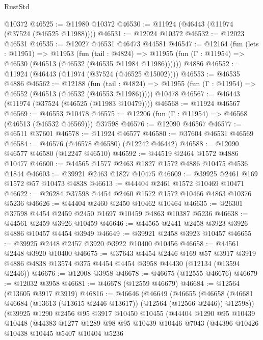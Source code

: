 \begin{lexlean}{RustStd}
\begin{coremodule}
    @10372
@46525 := @11980 @10372
@46530 := @11924 (@46443 (@11974 (@37524 (@46525 @11988))))
@46531 := @12024 @10372
@46532 := @12023 @46531
@46535 := @12027 @46531 @46473 @44581
@46547 := @12164
    (fun (lets : @11951) =>
    @11953
      (fun (tail : @4824) =>
      @11955 (fun (Γ : @11954) => @46530 (@46513 (@46532 (@46535 @11984 @11986))))))
    @4886
@46552 := @11924 (@46443 (@11974 (@37524 (@46525 @15002))))
@46553 := @46535 @4886
@46562 := @12188
    (fun (tail : @4824) => @11955 (fun (Γ : @11954) => @46552 (@46513 (@46532 (@46553 @11986)))))
    @10478
@46567 := @46443 (@11974 (@37524 (@46525 (@11983 @10479))))
@46568 := @11924 @46567
@46569 := @46553 @10478
@46575 := @12206 (fun (Γ : @11954) => @46568 (@46513 (@46532 @46569))) @37598
@46576 := @12090 @46567
@46577 := @46511 @37601
@46578 := @11924 @46577
@46580 := @37604 @46531 @46569
@46584 := @46576 (@46578 @46580) (@12242 @46442)
@46588 := @12090 @46577 @46580 (@12247 @46510)
@46592 := @44519 @2464 @1572 @4886 @10477
@46600 := @44565 @1577 @2463 @1827 @1572 @4886 @10475 @4536 @1844
@46603 := @39921 @2463 @1827 @10475
@46609 := @39925 @2461 @169 @1572 @57 @10473 @4838
@46613 := @44404 @2461 @1572 @10469 @10471
@46622 := @26284 @37598 @4454 @2460 @1572 @1572 @10466 @4863 @10376 @5236
@46626 := @44404 @2460 @2450 @10462 @10464
@46635 := @26301 @37598 @4454 @2459 @2450 @1697 @10459 @4863 @10387 @5236
@46638 := @44561 @2459 @3926 @10459
@46646 := @44565 @2441 @2458 @3923 @3926 @4886 @10457 @4454 @3949
@46649 := @39921 @2458 @3923 @10457
@46655 := @39925 @2448 @2457 @3920 @3922 @10400 @10456
@46658 := @44561 @2448 @3920 @10400
@46675 := @37643
    @4454
    @2446
    @169
    @57
    @3917
    @3919
    @4886
    @4838
    @13574
    @375
    @4454
    @4454
    @3958
    @44430
    (@12134 (@13594 @2446))
@46676 := @12008 @3958
@46678 := @46675 (@12555 @46676)
@46679 := @12032 @3958
@46681 := @46678 (@12559 @46679)
@46684 := @12564 (@13605 @3917 @3919)
@46816 := @46646
    (@46649
      (@46655
        (@46658 (@46681 @46684 (@13613 (@13615 @2446 @13617)) (@12564 (@12566 @2446)) @12598))
        (@39925
          @1290
          @2456
          @95
          @3917
          @10450
          @10455
          (@44404
            @1290
            @95
            @10439
            @10448
            (@44383
              @1277
              @1289
              @98
              @95
              @10439
              @10446
              @7043
              (@44396
                @10426
                @10438
                @10445
                @5407
                @10404
                @5236

\end{coremodule}
\end{lexlean}
